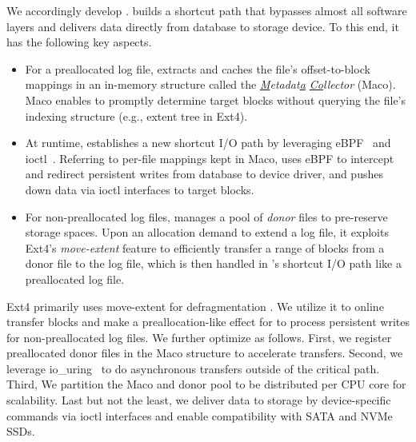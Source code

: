 We accordingly develop \odes. \odes builds a shortcut path  that bypasses almost all 
software layers and delivers data directly from database to storage device. 
To this end, it has the following key aspects.
\begin{itemize}[leftmargin=4mm]\setlength{\itemsep}{-\itemsep}
	\item 
	For a preallocated log file, %
	\odes extracts and caches the file's offset-to-block mappings 
	in an in-memory structure called the {\em \underline{M}etadat\underline{a} \underline{Co}llector} (Maco). 
	Maco enables \odes to promptly determine target blocks without querying the file's indexing structure (e.g., extent tree in Ext4). 
	\item 
	At runtime, \odes establishes a new shortcut I/O path by leveraging eBPF~\cite{ebpf} 
	and {ioctl}~\cite{ioctlWik84:online}. 
	Referring to per-file mappings kept in Maco, \odes uses eBPF to intercept and redirect 
	persistent writes
	from database to device driver, 
	and pushes down data via ioctl interfaces  to target blocks.
	\item 
	For non-preallocated log files, \odes manages a pool of {\em donor} files to pre-reserve storage spaces. %
	Upon an allocation demand to extend a  log file, it exploits Ext4's {\em move-extent} feature \cite{ext4moveextent} %
	 to efficiently transfer a range of blocks from a donor file to the log file, which
	is then handled %
	in \odes's shortcut I/O path like a preallocated log file. 
\end{itemize}


Ext4 primarily uses move-extent   for  defragmentation \cite{ext4moveextent}. %
We    utilize it to online transfer  blocks and 
make a preallocation-like effect for \odes to process persistent writes for non-preallocated log files. %
We further optimize \odes as follows.
First, we register preallocated donor files in the Maco  structure %
to accelerate  transfers.
Second, we
leverage  io\_uring~\cite{iouring} to do asynchronous transfers outside of the critical path.
Third,
We partition the Maco and donor pool  to be  distributed per CPU core for scalability. 
Last but not the least, we deliver data to storage   by device-specific commands via   ioctl interfaces and enable
compatibility
with  SATA and NVMe SSDs.


